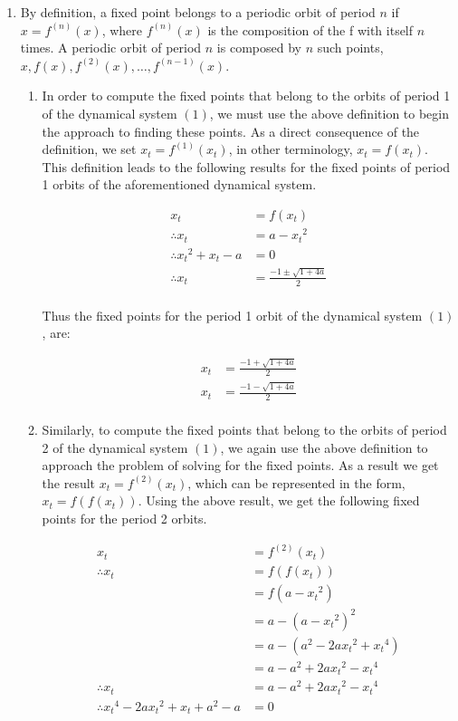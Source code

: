 \documentclass[a4paper]{article}
\begin{document}
\begin{enumerate}[label=\textbf{\arabic*.}]

	\item By definition, a fixed point belongs to a periodic orbit of period $n$ if $\displaystyle{x = f^{(n)}(x)}$, where $\displaystyle{f^{(n)}(x)}$ is the composition of the f with itself $n$ times. A periodic orbit of period $n$ is  composed by $n$ such points, $\displaystyle{x,f(x),f^{(2)}(x),\dots,f^{(n-1)}(x)}$.

	\begin{enumerate}
		\item In order to compute the fixed points that belong to the orbits of period 1 of the dynamical system $(1)$, we must use the above definition to begin the approach to finding these points. As a direct consequence of the definition, we set $\displaystyle{x_t = f^{(1)}(x_t)}$, in other terminology, $\displaystyle{x_t = f(x_t)}$. This definition leads to the following results for the fixed points of period 1 orbits of the aforementioned dynamical system.

		\begin{align*}
		x_t & = f(x_t)\\
		\therefore x_t & = a - {x_t}^2\\
		\therefore {x_t}^2 + x_t - a & = 0\\
		\therefore x_t & = \frac{-1 \pm \sqrt{1+4a}}{2}\\
		\end{align*}

		Thus the fixed points for the period 1 orbit of the dynamical system $(1)$, are:

		\begin{align*}
		x_t & = \frac{-1 + \sqrt{1+4a}}{2}\\
		x_t & = \frac{-1 - \sqrt{1+4a}}{2}\\
		\end{align*}


		\item Similarly, to compute the fixed points that belong to the orbits of period 2 of the dynamical system $(1)$, we again use the above definition to approach the problem of solving for the fixed points. As a result we get the result $\displaystyle{x_t = f^{(2)}(x_t)}$, which can be represented in the form, $\displaystyle{x_t = f(f(x_t))}$. Using the above result, we get the following fixed points for the period 2 orbits.

		\begin{align*}
		x_t & = f^{(2)}(x_t)\\
		\therefore x_t & = f(f(x_t))\\
		& = f(a - {x_t}^2)\\
		& = a - \left(a - {x_t}^2\right)^2\\
		& = a - \left(a^2 - 2a{x_t}^2 + {x_t}^4 \right)\\
		& = a - a^2 + 2a{x_t}^2 - {x_t}^4\\
		\therefore x_t & = a - a^2 + 2a{x_t}^2 - {x_t}^4\\
		\therefore {x_t}^4 - 2a{x_t}^2 + x_t + a^2 - a & = 0\\
		\end{align*}


\end{enumerate}
\end{enumerate}
\end{document}
